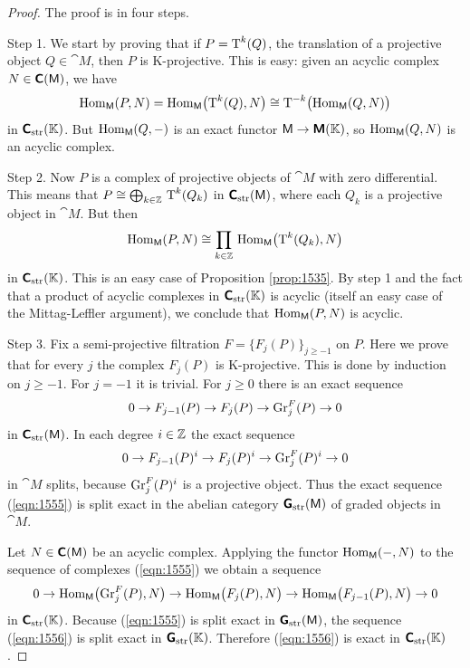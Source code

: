 \begin{proof} The proof is in four steps. 

\medskip \noindent
Step 1. We start by proving that if $P = \operatorname{T}^k(Q)$, the translation of a 
projective object $Q \in \cat{M}$, then $P$ is K-projective. This is easy: 
given an acyclic complex $N \in \boldsymbol{\mathsf{C}}(\operatorname{\mathsf{M}})$, we have 
\[ \operatorname{Hom}_{\operatorname{\mathsf{M}}}(P, N) = 
\operatorname{Hom}_{\operatorname{\mathsf{M}}} \bigl( \operatorname{T}^k(Q), N \bigr) \cong
\operatorname{T}^{-k} \bigl( \operatorname{Hom}_{\operatorname{\mathsf{M}}}(Q, N) \bigr) \]
in $\boldsymbol{\mathsf{C}}_{\mathrm{str}}(\mathbb{K})$. But 
$\operatorname{Hom}_{\operatorname{\mathsf{M}}}(Q, -)$ is an exact functor 
$\operatorname{\mathsf{M}} \to \boldsymbol{\mathsf{M}}(\mathbb{K})$, so $\operatorname{Hom}_{\operatorname{\mathsf{M}}}(Q, N)$ is an acyclic 
complex. 

\medskip \noindent
Step 2. Now $P$ is a complex of projective objects of $\cat{M}$ with zero 
differential. This means that 
$P \cong \bigoplus_{k \in \mathbb{Z}} \, \operatorname{T}^k(Q_k)$ 
in $\boldsymbol{\mathsf{C}}_{\mathrm{str}}(\operatorname{\mathsf{M}})$, where each $Q_k$ is a projective object in 
$\cat{M}$. But then 
\[ \operatorname{Hom}_{\operatorname{\mathsf{M}}}(P, N) \cong 
\prod_{k \in \mathbb{Z}} \, \operatorname{Hom}_{\operatorname{\mathsf{M}}} \bigl( \operatorname{T}^k(Q_k), N \bigr)  \]
in $\boldsymbol{\mathsf{C}}_{\mathrm{str}}(\mathbb{K})$. 
This is an easy case of Proposition \ref{prop:1535}. By step 1 and the fact 
that a product of acyclic complexes in $\boldsymbol{\mathsf{C}}_{\mathrm{str}}(\mathbb{K})$ is acyclic 
(itself an easy case of the Mittag-Leffler argument), we conclude that 
$\operatorname{Hom}_{\operatorname{\mathsf{M}}}(P, N)$ is acyclic. 

\medskip \noindent
Step 3. Fix a semi-projective filtration $F = \{ F_j(P) \}_{j \geq -1}$
on $P$. Here we prove that for every $j$ the complex  
$F_j(P)$ is K-projective. This is done by induction on $j \geq -1$. 
For $j = -1$ it is trivial. For $j \geq 0$ there is an exact sequence 
\begin{equation} \label{eqn:1555}
0 \to F_{j - 1}(P) \to F_j(P) \to \operatorname{Gr}^F_j(P) \to 0 
\end{equation}
in $\boldsymbol{\mathsf{C}}_{\mathrm{str}}(\operatorname{\mathsf{M}})$. 
In each degree $i \in \mathbb{Z}$ the exact sequence 
\[ 0 \to F_{j - 1}(P)^i \to F_j(P)^i \to \operatorname{Gr}^F_j(P)^i \to 0 \]
in $\cat{M}$ splits, because $\operatorname{Gr}^F_j(P)^i$ is a projective object.
Thus the exact sequence (\ref{eqn:1555}) is split exact in the abelian category 
$\operatorname{\boldsymbol{\mathsf{G}}}_{\mathrm{str}}(\operatorname{\mathsf{M}})$ of graded objects in $\cat{M}$. 

Let $N \in \boldsymbol{\mathsf{C}}(\operatorname{\mathsf{M}})$ be an acyclic complex. Applying the 
functor $\operatorname{Hom}_{\operatorname{\mathsf{M}}}(-, N)$ 
to the sequence of complexes (\ref{eqn:1555}) we obtain a sequence 
\begin{equation} \label{eqn:1556}
0 \to \operatorname{Hom}_{\operatorname{\mathsf{M}}} \bigl( \operatorname{Gr}^F_j(P), N \bigr) \to 
\operatorname{Hom}_{\operatorname{\mathsf{M}}} \bigl( F_j(P), N \bigr) \to
\operatorname{Hom}_{\operatorname{\mathsf{M}}} \bigl( F_{j - 1}(P), N \bigr) \to  0 
\end{equation}
in $\boldsymbol{\mathsf{C}}_{\mathrm{str}}(\mathbb{K})$. Because (\ref{eqn:1555}) is split exact in 
$\operatorname{\boldsymbol{\mathsf{G}}}_{\mathrm{str}}(\operatorname{\mathsf{M}})$, the sequence (\ref{eqn:1556}) is split exact 
in $\operatorname{\boldsymbol{\mathsf{G}}}_{\mathrm{str}}(\mathbb{K})$. Therefore (\ref{eqn:1556}) is exact in 
$\boldsymbol{\mathsf{C}}_{\mathrm{str}}(\mathbb{K})$.


\end{proof}
